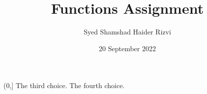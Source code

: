 \documentclass{exam}
\title{Functions Assignment}
\author{Syed Shamshad Haider Rizvi}
\date{20 September 2022}
\begin{document}
\maketitle

\begin{questions}

    
    \begin{oneparchoices}
    \choice \left[0, 1\right]
    \choice \left(0,\right]
    \choice The third choice.
    \choice The fourth choice.
  \end{oneparchoices}

\end{questions}
\end{document}
